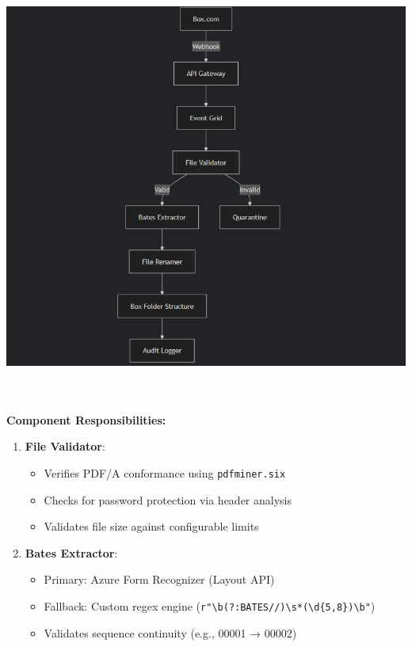 \documentclass[
]{article}
\providecommand{\tightlist}{%
  \setlength{\itemsep}{0pt}\setlength{\parskip}{0pt}}
\begin{document}
\includegraphics[width=6.5in,height=5.85556in]{image1.png}\textbf{Component
Responsibilities:}

\begin{enumerate}
\def\labelenumi{\arabic{enumi}.}
\item
  \textbf{File Validator}:

  \begin{itemize}
  \tightlist
  \item
    Verifies PDF/A conformance using \texttt{pdfminer.six}
  \item
    Checks for password protection via header analysis
  \item
    Validates file size against configurable limits
  \end{itemize}
\item
  \textbf{Bates Extractor}:

  \begin{itemize}
  \tightlist
  \item
    Primary: Azure Form Recognizer (Layout API)
  \item
    Fallback: Custom regex engine
    (\texttt{r"\textbackslash{}b}\texttt{(?:}\texttt{BATES\textbar{}//)\textbackslash{}s*(\textbackslash{}d\{5,8\})\textbackslash{}b"})
  \item
    Validates sequence continuity (e.g., 00001 → 00002)
  \end{itemize}
\end{enumerate}
\end{document}
